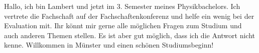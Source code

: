 \begin{multicols}{2}
{
Hallo, ich bin Lambert und jetzt im 3. Semester meines Physikbachelors. Ich vertrete die Fachschaft auf der Fachschaftenkonferenz und helfe ein wenig bei der Evaluation mit. 
Ihr könnt mir gerne alle möglichen Fragen zum Studium und auch anderen Themen stellen. Es ist aber gut möglich, dass ich die Antwort nicht kenne. 
Willkommen in Münster und einen schönen Studiumsbeginn!
}



\end{multicols}
